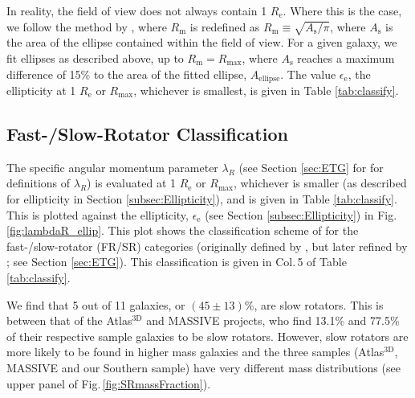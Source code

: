 		In reality, the field of view does not always contain 1 $R_\mathrm{e}$. Where this is the case, we follow the method by \citet{Emsellem2007}, where $R_\mathrm{m}$ is redefined as $R_\mathrm{m} \equiv \sqrt{A_\mathrm{s}/\pi}$, where $A_\mathrm{s}$ is the area of the ellipse contained within the field of view. For a given galaxy, we fit ellipses as described above, up to $R_\mathrm{m} = R_\mathrm{max}$, where $A_\mathrm{s}$ reaches a maximum difference of 15\% to the area of the fitted ellipse, $A_\text{ellipse}$. The value $\epsilon_\mathrm{e}$, the ellipticity at 1 $R_\mathrm{e}$ or $R_\text{max}$, whichever is smallest, is given in Table \ref{tab:classify}. 

	\subsection{Fast-/Slow-Rotator Classification}
		\label{subsec:FSRot}

		The specific angular momentum parameter $\lambda_R$ (see Section \ref{sec:ETG} for for definitions of $\lambda_R$) is evaluated at 1 $R_\mathrm{e}$ or $R_\text{max}$, whichever is smaller (as described for ellipticity in Section \ref{subsec:Ellipticity}), and is given in Table \ref{tab:classify}. This is plotted against the ellipticity, $\epsilon_\mathrm{e}$ (see Section \ref{subsec:Ellipticity}) in Fig.\,\ref{fig:lambdaR_ellip}. This plot shows the classification scheme of \citet{Cappellari2016} for the fast-/slow-rotator (FR/SR) categories (originally defined by \citealt{Emsellem2011}, but later refined by \citealt{Cappellari2016}; see Section \ref{sec:ETG}). This classification is given in Col.\,5 of Table \ref{tab:classify}.

		We find that 5 out of 11 galaxies, or $(45\pm13)$\%, are slow rotators. This is between that of the Atlas$^\text{3D}$ and MASSIVE projects, who find 13.1\% and 77.5\% of their respective sample galaxies to be slow rotators. However, slow rotators are more likely to be found in higher mass galaxies and the three samples (Atlas$^\text{3D}$, MASSIVE and our Southern sample) have very different mass distributions (see upper panel of Fig.\,\ref{fig:SRmassFraction}).

